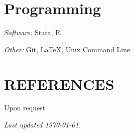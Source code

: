 \documentclass[letterpaper]{article}
\renewenvironment{itemize}{
  \begin{list}{}{
    \setlength{\leftmargin}{1.5em}
  }
}{
  \end{list}
}
\begin{document}
\section*{Programming}

\begin{itemize}
    \item \textit{Software:} \hspace{10pt} Stata, R
    
    \item \textit{Other:} \hspace{22pt} Git, LaTeX, Unix Command Line 
\end{itemize}


\section*{REFERENCES}

\begin{itemize}
    \item Upon request
\end{itemize}

\bigskip

\vfill 
\begin{itemize}
    \item \emph{Last updated {\today}.}
\end{itemize}
\end{document}
